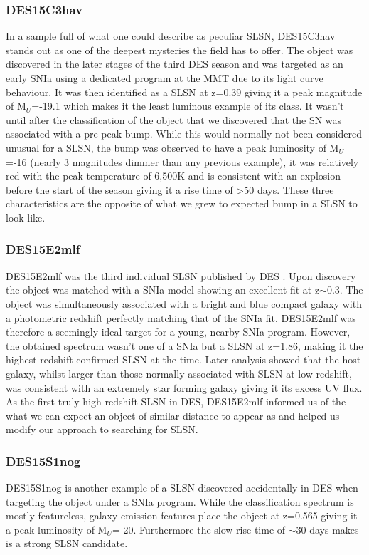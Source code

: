\subsubsection{DES15C3hav}
In a sample full of what one could describe as peculiar SLSN, DES15C3hav stands out as one of the deepest mysteries the field has to offer. The object was discovered in the later stages of the third DES season and was targeted as an early SNIa using a dedicated program at the MMT due to its light curve behaviour. It was then identified as a SLSN at z=0.39 giving it a peak magnitude of M$_U$=-19.1 which makes it the least luminous example of its class. It wasn't until after the classification of the object that we discovered that the SN was associated with a pre-peak bump. While this would normally not been considered unusual for a SLSN, the bump was observed to have a peak luminosity of M$_U$=-16 (nearly 3 magnitudes dimmer than any previous example), it was relatively red with the peak temperature of 6,500K and is consistent with an explosion before the start of the season giving it a rise time of >50 days. These three characteristics are the opposite of what we grew to expected bump in a  SLSN to look like. 

\subsubsection{DES15E2mlf}
DES15E2mlf was the third individual SLSN published by DES \citep{Pan2017}. Upon discovery the object was matched with a SNIa model showing an excellent fit at z$\sim$0.3. The object was simultaneously associated with a bright and blue compact galaxy with a photometric redshift perfectly matching that of the SNIa fit. DES15E2mlf was therefore a seemingly ideal target for a young, nearby SNIa program. However, the obtained spectrum wasn't one of a SNIa but a SLSN at z=1.86, making it the highest redshift confirmed SLSN at the time. Later analysis showed that the host galaxy, whilst larger than those normally associated with SLSN at low redshift, was consistent with an extremely star forming galaxy giving it its excess UV flux. As the first truly high redshift SLSN in DES, DES15E2mlf informed us of the what we can expect an object of similar distance to appear as and helped us modify our approach to searching for SLSN.  

\subsubsection{DES15S1nog}
DES15S1nog is another example of a SLSN discovered accidentally in DES when targeting the object under a SNIa program. While the classification spectrum is mostly featureless, galaxy emission features place the object at z=0.565 giving it a peak luminosity of M$_U$=-20. Furthermore the slow rise time of $\sim$30 days makes is a strong SLSN candidate.

